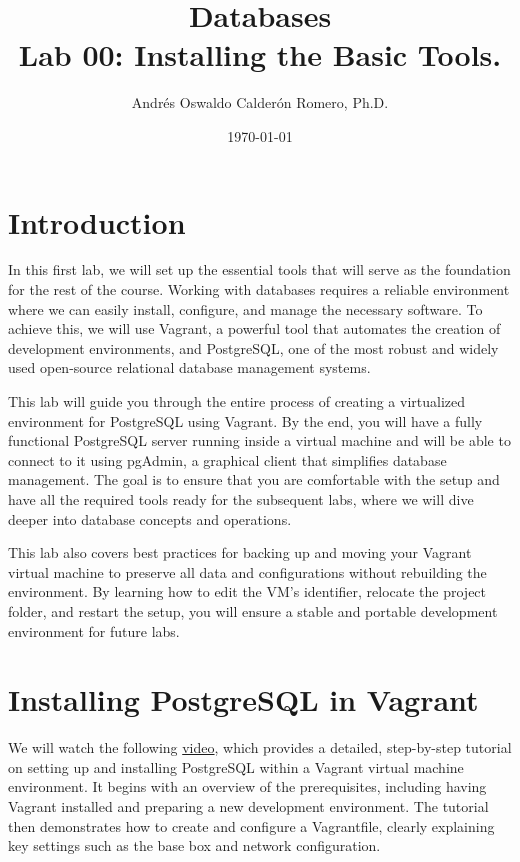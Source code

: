 \documentclass{article}
\title{Databases \\ Lab 00: Installing the Basic Tools.}
\author{Andrés Oswaldo Calderón Romero, Ph.D.}
\date{\today}
\begin{document}
\maketitle

\section{Introduction}
In this first lab, we will set up the essential tools that will serve as the foundation for the rest of the course. Working with databases requires a reliable environment where we can easily install, configure, and manage the necessary software. To achieve this, we will use Vagrant, a powerful tool that automates the creation of development environments, and PostgreSQL, one of the most robust and widely used open-source relational database management systems.

This lab will guide you through the entire process of creating a virtualized environment for PostgreSQL using Vagrant. By the end, you will have a fully functional PostgreSQL server running inside a virtual machine and will be able to connect to it using pgAdmin, a graphical client that simplifies database management. The goal is to ensure that you are comfortable with the setup and have all the required tools ready for the subsequent labs, where we will dive deeper into database concepts and operations.

This lab also covers best practices for backing up and moving your Vagrant virtual machine to preserve all data and configurations without rebuilding the environment. By learning how to edit the VM’s identifier, relocate the project folder, and restart the setup, you will ensure a stable and portable development environment for future labs.

\section{Installing PostgreSQL in Vagrant} \label{sec:installing}

We will watch the following \href{https://youtu.be/BJ37nFhtN8Y?si=PgWnXo-vMv7fxT48}{video}, which provides a detailed, step-by-step tutorial on setting up and installing PostgreSQL within a Vagrant virtual machine environment. It begins with an overview of the prerequisites, including having Vagrant installed and preparing a new development environment. The tutorial then demonstrates how to create and configure a Vagrantfile, clearly explaining key settings such as the base box and network configuration.
\end{document}
